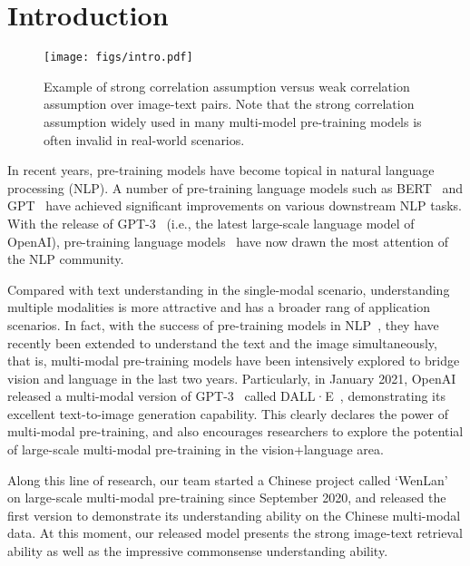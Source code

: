 \documentclass[10pt,twocolumn,letterpaper]{article}
\begin{document}
\section{Introduction}

\begin{figure}[t]
    \centering
    \texttt{[image: figs/intro.pdf]}
\caption{
    Example of strong correlation assumption versus weak correlation assumption over image-text pairs. Note that the strong correlation assumption widely used in many multi-model pre-training models is often invalid in real-world scenarios. }
    \label{fig:intro}
    \vspace{-0.05in}
\end{figure}

In recent years, pre-training models have become topical in natural language processing (NLP). A number of pre-training language models such as BERT~\cite{devlin2018bert,liu2019roberta,Lan2020ALBERT} and GPT~\cite{radford2018improving,radford2019language,brown2020language} have achieved significant improvements on various downstream NLP tasks. With the release of GPT-3~\cite{brown2020language} (i.e., the latest large-scale language model of OpenAI), pre-training language models~\cite{radford2021learning,roberts2020much,guu2020realm} have now drawn the most attention of the NLP community. 

Compared with text understanding in the single-modal scenario, understanding multiple modalities is more attractive and has a broader rang of application scenarios. In fact, with the success of pre-training models in NLP~\cite{dai2015semi,peters2018deep,howard2018universal,raffel2019exploring}, they have recently been extended to understand the text and the image simultaneously, that is, multi-modal pre-training models have been intensively explored to bridge vision and language in the last two years. Particularly, in January 2021, OpenAI released a multi-modal version of GPT-3~\cite{brown2020language} called DALL·E~\cite{aditya2021dall}, demonstrating its excellent text-to-image generation capability. This clearly declares the power of multi-modal pre-training, and also encourages researchers to explore the potential of large-scale multi-modal pre-training in the vision+language area.

Along this line of research, our team started a Chinese project called `WenLan' on large-scale multi-modal pre-training since September 2020, and released the first version to demonstrate its understanding ability on the Chinese multi-modal data. At this moment, our released model presents the strong image-text retrieval ability as well as the impressive commonsense understanding ability.
\end{document}
